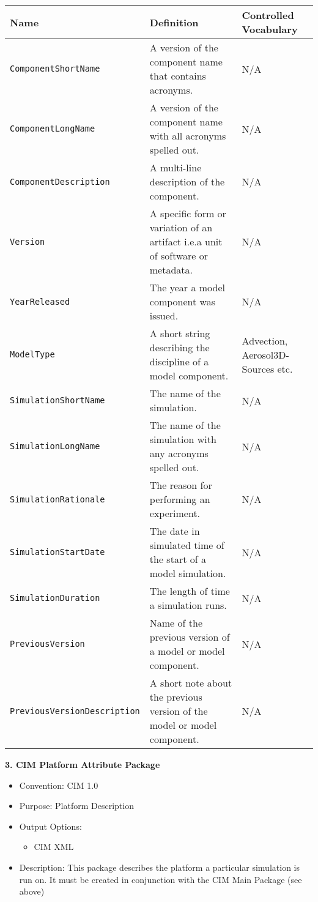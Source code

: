 \begin{tabular}{|p{8cm}|p{20cm}|p{10cm}}
     {\bf Name} & {\bf Definition} & {\bf Controlled Vocabulary}\\
     \hline\hline
     {\tt ComponentShortName} & A version of the component name that contains acronyms. & N/A \\
     {\tt ComponentLongName} & A version of the component name with all acronyms spelled out. & N/A\\
     {\tt ComponentDescription} & A multi-line description of the component. & N/A \\
     {\tt Version} &  A specific form or variation of an artifact i.e.a unit of software or metadata. & N/A\\
     {\tt YearReleased} & The year a model component was issued. & N/A \\
     {\tt ModelType} & A short string describing the discipline of a model component. & Advection, Aerosol3D-Sources etc.\\
     {\tt SimulationShortName} & The name of the simulation. & N/A \\
     {\tt SimulationLongName} & The name of the simulation with any acronyms spelled out. & N/A \\ 
     {\tt SimulationRationale} & The reason for performing an experiment. & N/A\\
     {\tt SimulationStartDate} & The date in simulated time of the start of a model simulation. & N/A\\ 
     {\tt SimulationDuration} & The length of time a simulation runs.&  N/A\\ 
     {\tt PreviousVersion} & Name of the previous version of a model or model component. & N/A\\ 
     {\tt PreviousVersionDescription} &  A short note about the previous version of the model or model component. & N/A \\ 
\end{tabular}




\vspace{.25in}


{\bf 3. CIM Platform Attribute Package}

\begin{itemize}
    \item Convention: CIM 1.0
    \item Purpose: Platform Description
    \item Output Options:
    \begin{itemize}
       \item CIM XML 
    \end{itemize} 
    \item Description: This package describes the platform a particular simulation is run on. It must be created in conjunction with the CIM Main Package (see above) 
\end{itemize}


